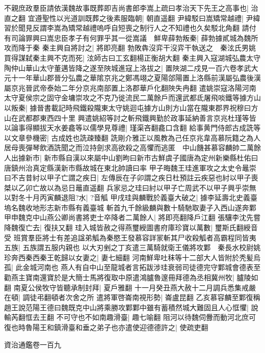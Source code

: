不親庶政羣臣請依漢魏故事既葬即吉尚書郎李嵩上疏曰孝治天下先王之高事也|{
	治直之翻}
宜遵聖性以光道訓既葬之後素服臨朝|{
	朝直遥翻}
尹緯駁曰嵩矯常越禮|{
	尹緯習於聞見反謂李嵩為矯常越禮嗚呼自短喪之制行人之不知禮也久矣駁北角翻}
請付有司論罪興曰嵩忠臣孝子有何罪乎其一從嵩議　鮮卑薛勃叛秦|{
	薛勃據貳城為魏所攻而降于秦}
秦主興自將討之|{
	將即亮翻}
勃敗犇沒弈干沒弈干執送之　秦泫氏男姚買得謀弑秦主興不克而死|{
	泫師古曰工玄翻楊正衡胡大翻}
秦主興入寇湖城弘農太守陶仲山華山太守董邁皆降之遂至陜城進寇上洛拔之|{
	置陜湖二戍見一百六卷孝武大元十一年華山郡晉分弘農之華隂京兆之鄭馮翊之夏陽郃陽置上洛縣前漢屬弘農後漢屬京兆晉武帝泰始二年分京兆南部置上洛郡華戶化翻陜失冉翻}
遣姚崇寇洛陽河南太守夏侯宗之固守金墉崇攻之不克乃徙流民二萬餘戶而還武都氐屠飛啖鐵等據方山以叛秦|{
	據晉書載記時飛鐵殺隴東太守姚迴屯據方山則方山當在隴東郡界祝穆曰方山在武都郡東西四十里}
興遣姚紹等討之斬飛鐵興勤於政事延納善言京兆杜瑾等皆以論事得顯拔天水姜龕等以儒學見尊禮|{
	瑾渠吝翻龕口含翻}
給事黄門侍郎古成詵等以文章參機密|{
	古成姓也詵疎臻翻}
詵剛介雅正以風教為己任京兆韋高慕阮籍之為人居母喪彈琴飲酒詵聞之而泣持劍求高欲殺之高懼而逃匿　中山饑甚慕容麟帥二萬餘人出據新市|{
	新市縣自漢以來屬中山劉昫曰新市古鮮虞子國唐為定州新樂縣杜佑曰唐鎮州治真定縣漢新市縣故城在東北帥讀曰率}
甲子晦魏王珪進軍攻之太史令鼂崇曰不吉昔紂以甲子亡謂之疾日|{
	左傳辰在子卯謂之疾日杜預註云疾惡也紂以甲子喪桀以乙卯亡故以為忌日鼂直遥翻}
兵家忌之珪曰紂以甲子亡周武不以甲子興乎崇無以對冬十月丙寅麟退阻?水|{
	?音觚}
甲戌珪與麟戰於義臺大破之|{
	據李延壽北史義臺塢名魏收地形志新市縣有義臺城}
斬首九千餘級麟與數十騎馳取妻子入西山遂奔鄴甲申魏克中山燕公卿尚書將吏士卒降者二萬餘人|{
	將即亮翻降戶江翻}
張驤李沈先嘗降魏復亡去|{
	復扶又翻}
珪入城皆赦之得燕璽綬圖書府庫珍寶以萬數|{
	璽斯氏翻綬音受}
班賞羣臣將士有差追諡弟觚為秦愍王發慕容詳冡斬其尸收殺觚者高霸程同皆夷五族|{
	五族謂五服内親也}
以大刃剉之丁亥遣三萬騎就衛王儀將攻鄴　秦長水校尉姚珍奔西秦西秦王乾歸以女妻之|{
	妻七細翻}
河南鮮卑吐秣等十二部大人皆附於秃髪烏孤|{
	此金城河南也}
燕人有自中山至龍城者言拓跋涉珪衰弱司徒德完守鄴城會德表至勸燕主寶南還寶於是大簡士馬將復取中原遣鴻臚魯邃冊拜德為丞相冀州牧|{
	臚陵如翻}
南夏公侯牧守皆聽承制封拜|{
	夏戶雅翻}
十一月癸丑燕大赦十二月調兵悉集戒嚴在頓|{
	調徒弔翻頓者次舍之所}
遣將軍啓崙南視形勢|{
	崙盧昆翻}
乙亥慕容麟至鄴復稱趙王說范陽王德曰魏既克中山將乘勝攻鄴鄴中雖有蓄積然城大難固且人心恇懼|{
	說輸芮翻恇去王翻}
不可守也不如南趣滑臺|{
	趣七喻翻}
阻河以待魏伺釁而動河北庶可復也時魯陽王和鎮滑臺和垂之弟子也亦遣使迎德德許之|{
	使疏吏翻}


資治通鑑卷一百九
